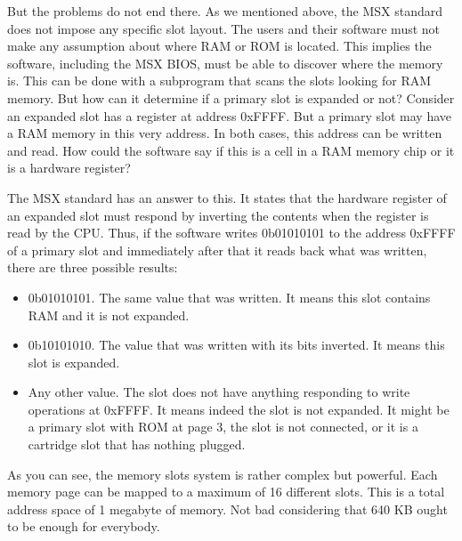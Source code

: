 But the problems do not end there. As we mentioned above, the MSX standard does not impose any specific slot layout. The users and their software must not make any assumption about where RAM or ROM is located. This implies the software, including the MSX BIOS, must be able to discover where the memory is. This can be done with a subprogram that scans the slots looking for RAM memory. But how can it determine if a primary slot is expanded or not? Consider an expanded slot has a register at address 0xFFFF. But a primary slot may have a RAM memory in this very address. In both cases, this address can be written and read. How could the software say if this is a cell in a RAM memory chip or it is a hardware register?

The MSX standard has an answer to this. It states that the hardware register of an expanded slot must respond by inverting the contents when the register is read by the CPU. Thus, if the software writes 0b01010101 to the address 0xFFFF of a primary slot and immediately after that it reads back what was written, there are three possible results:

\begin{itemize}
	\item 0b01010101. The same value that was written. It means this slot contains RAM and it is not expanded.
	\item 0b10101010. The value that was written with its bits inverted. It means this slot is expanded.
	\item Any other value. The slot does not have anything responding to write operations at 0xFFFF. It means indeed the slot is not expanded. It might be a primary slot with ROM at page 3, the slot is not connected, or it is a cartridge slot that has nothing plugged.
\end{itemize}

As you can see, the memory slots system is rather complex but powerful. Each memory page can be mapped to a maximum of 16 different slots. This is a total address space of 1 megabyte of memory. Not bad considering that 640 KB ought to be enough for everybody. 

